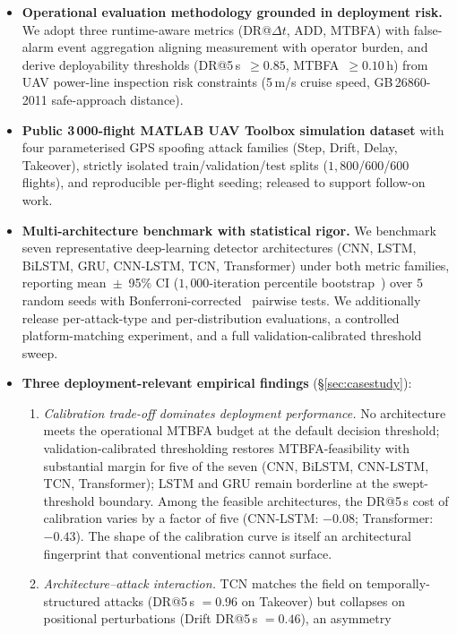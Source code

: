 \documentclass{ieeeaccess}
\begin{document}
\begin{itemize}
\item \textbf{Operational evaluation methodology grounded in deployment risk.}
  We adopt three runtime-aware metrics (DR@$\Delta t$, ADD, MTBFA) with
  false-alarm event aggregation aligning measurement with operator burden,
  and derive deployability thresholds (DR@5\,s~$\geq 0.85$, MTBFA~$\geq 0.10$\,h)
  from UAV power-line inspection risk constraints (5\,m/s cruise speed,
  GB\,26860-2011 safe-approach distance).
\item \textbf{Public 3\,000-flight MATLAB UAV Toolbox simulation dataset}
  with four parameterised GPS spoofing attack families (Step, Drift, Delay,
  Takeover), strictly isolated train/validation/test splits
  ($1{,}800$/$600$/$600$ flights), and reproducible per-flight seeding;
  released to support follow-on work.
\item \textbf{Multi-architecture benchmark with statistical rigor.}
  We benchmark seven representative deep-learning detector architectures
  (CNN, LSTM, BiLSTM, GRU, CNN-LSTM, TCN, Transformer) under both metric
  families, reporting mean~$\pm$~95\% CI ($1{,}000$-iteration percentile
  bootstrap~\cite{ref46}) over $5$ random seeds with
  Bonferroni-corrected~\cite{ref45} pairwise tests. We additionally release per-attack-type
  and per-distribution evaluations, a controlled platform-matching experiment,
  and a full validation-calibrated threshold sweep.
\item \textbf{Three deployment-relevant empirical findings} (\S\ref{sec:casestudy}):
  \begin{enumerate}
    \item \emph{Calibration trade-off dominates deployment performance.}
      No architecture meets the operational MTBFA budget at the default
      decision threshold; validation-calibrated thresholding restores
      MTBFA-feasibility with substantial margin for five of the seven
      (CNN, BiLSTM, CNN-LSTM, TCN, Transformer); LSTM and GRU remain
      borderline at the swept-threshold boundary. Among the feasible
      architectures, the DR@5\,s cost of calibration varies by a factor
      of five (CNN-LSTM: $-0.08$; Transformer: $-0.43$). The shape of
      the calibration curve is itself an architectural fingerprint that
      conventional metrics cannot surface.
    \item \emph{Architecture--attack interaction.} TCN matches the field on
      temporally-structured attacks (DR@5\,s $=0.96$ on Takeover) but collapses
      on positional perturbations (Drift DR@5\,s $=0.46$), an asymmetry

\end{enumerate}
\end{itemize}
\end{document}
